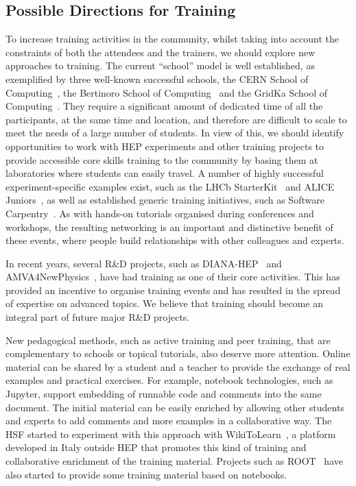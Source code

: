 \subsection{Possible Directions for Training}

To increase training activities in the community, whilst taking into
account the constraints of both the attendees and the trainers, we should
explore new approaches to training. The current ``school''
model is well established, as exemplified by three well-known successful
schools, the CERN School of Computing~\cite{CSC},
the Bertinoro School of Computing~\cite{ESC2017}
and the GridKa School of Computing~\cite{GridKASchool}.
They require a significant amount of
dedicated time of all the participants, at the same time and location,
and therefore are difficult to scale to meet the needs of a large number
of students. In view of this, we should identify opportunities to work
with HEP experiments and other training projects to provide accessible
core skills training to the community by basing them at laboratories
where students can easily travel. A number of highly successful
experiment-specific examples exist, such as the LHCb StarterKit~\cite{LHCbStarterkit}
and ALICE Juniors~\cite{ALICEJuniors}, as well as
established generic training initiatives, such as
Software Carpentry~\cite{SoftwareCarpentry}. As with hands-on tutorials organised during
conferences and workshops, the resulting networking is an important and
distinctive benefit of these events, where people build relationships
with other colleagues and experts.

In recent years, several R\&D projects, such as DIANA-HEP~\cite{DIANA-HEP} and
AMVA4\-New\-Physics~\cite{AMVA4NewPhysics}, have had training as one
of their core activities. This
has provided an incentive to organise training events and has resulted
in the spread of expertise on advanced topics. We believe that training
should become an integral part of future major R\&D projects.

New pedagogical methods, such as active training and peer training, that
are complementary to schools or topical tutorials, also deserve more
attention. Online material can be shared by a student and a teacher to
provide the exchange of real examples and practical exercises. For
example, notebook technologies, such as Jupyter, support embedding of
runnable code and comments into the same document. The initial material
can be easily enriched by allowing other students and experts to add
comments and more examples in a collaborative way. The HSF started to
experiment with this approach with WikiToLearn~\cite{WikiToLearn}, a
platform developed in Italy outside HEP that promotes this kind of
training and collaborative enrichment of the training material. Projects
such as ROOT~\cite{Brun1996} have also started to provide some
training material based
on notebooks.

